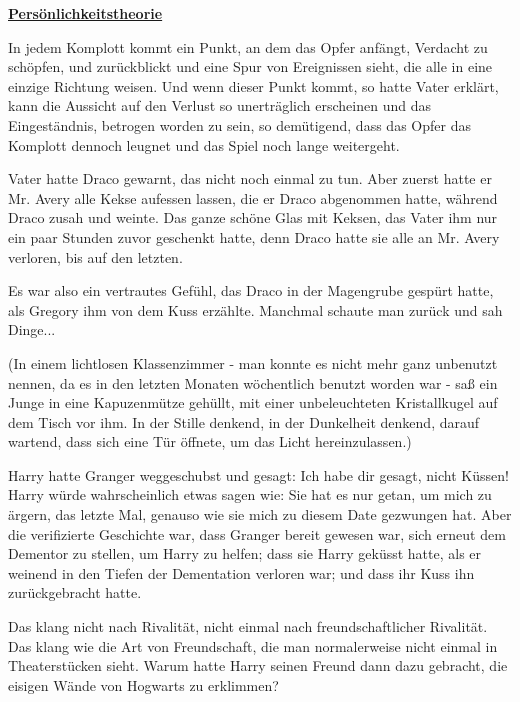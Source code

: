

\hypertarget{persuxf6nlichkeitstheorie}{%

\textbf{\uline{Persönlichkeitstheorie}}

\hfill\break In jedem Komplott kommt ein Punkt, an dem das Opfer anfängt, Verdacht zu schöpfen, und zurückblickt und eine Spur von Ereignissen sieht, die alle in eine einzige Richtung weisen. Und wenn dieser Punkt kommt, so hatte Vater erklärt, kann die Aussicht auf den Verlust so unerträglich erscheinen und das Eingeständnis, betrogen worden zu sein, so demütigend, dass das Opfer das Komplott dennoch leugnet und das Spiel noch lange weitergeht.

Vater hatte Draco gewarnt, das nicht noch einmal zu tun. Aber zuerst hatte er Mr. Avery alle Kekse aufessen lassen, die er Draco abgenommen hatte, während Draco zusah und weinte. Das ganze schöne Glas mit Keksen, das Vater ihm nur ein paar Stunden zuvor geschenkt hatte, denn Draco hatte sie alle an Mr. Avery verloren, bis auf den letzten.

Es war also ein vertrautes Gefühl, das Draco in der Magengrube gespürt hatte, als Gregory ihm von dem Kuss erzählte. Manchmal schaute man zurück und sah Dinge...

(In einem lichtlosen Klassenzimmer - man konnte es nicht mehr ganz unbenutzt nennen, da es in den letzten Monaten wöchentlich benutzt worden war - saß ein Junge in eine Kapuzenmütze gehüllt, mit einer unbeleuchteten Kristallkugel auf dem Tisch vor ihm. In der Stille denkend, in der Dunkelheit denkend, darauf wartend, dass sich eine Tür öffnete, um das Licht hereinzulassen.)

Harry hatte Granger weggeschubst und gesagt: Ich habe dir gesagt, nicht Küssen! Harry würde wahrscheinlich etwas sagen wie: Sie hat es nur getan, um mich zu ärgern, das letzte Mal, genauso wie sie mich zu diesem Date gezwungen hat. Aber die verifizierte Geschichte war, dass Granger bereit gewesen war, sich erneut dem Dementor zu stellen, um Harry zu helfen; dass sie Harry geküsst hatte, als er weinend in den Tiefen der Dementation verloren war; und dass ihr Kuss ihn zurückgebracht hatte.

Das klang nicht nach Rivalität, nicht einmal nach freundschaftlicher Rivalität. Das klang wie die Art von Freundschaft, die man normalerweise nicht einmal in Theaterstücken sieht. Warum hatte Harry seinen Freund dann dazu gebracht, die eisigen Wände von Hogwarts zu erklimmen?

}
